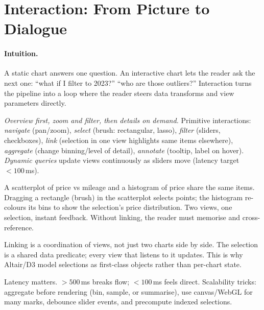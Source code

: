 \section{Interaction: From Picture to Dialogue}
\label{sec:interaction}
\paragraph{Intuition.} A static chart answers one question. An interactive chart lets the reader ask the next one: ``what if I filter to 2023?'' ``who are those outliers?'' Interaction turns the pipeline into a loop where the reader steers data transforms and view parameters directly.

\begin{definition}\label{def:interaction}
\emph{Overview first, zoom and filter, then details on demand.} Primitive interactions: \emph{navigate} (pan/zoom), \emph{select} (brush: rectangular, lasso), \emph{filter} (sliders, checkboxes), \emph{link} (selection in one view highlights same items elsewhere), \emph{aggregate} (change binning/level of detail), \emph{annotate} (tooltip, label on hover). \emph{Dynamic queries} update views continuously as sliders move (latency target $<100$\,ms).
\end{definition}

\begin{example}\label{ex:brushing}
A scatterplot of price vs mileage and a histogram of price share the same items. Dragging a rectangle (brush) in the scatterplot selects points; the histogram re-colours its bins to show the selection's price distribution. Two views, one selection, instant feedback. Without linking, the reader must memorise and cross-reference.
\end{example}

\begin{remark}\label{rem:linking}
Linking is a coordination of views, not just two charts side by side. The selection is a shared data predicate; every view that listens to it updates. This is why Altair/D3 model selections as first-class objects rather than per-chart state.
\end{remark}

Latency matters. $>500$\,ms breaks flow; $<100$\,ms feels direct. Scalability tricks: aggregate before rendering (bin, sample, or summarise), use canvas/WebGL for many marks, debounce slider events, and precompute indexed selections.

